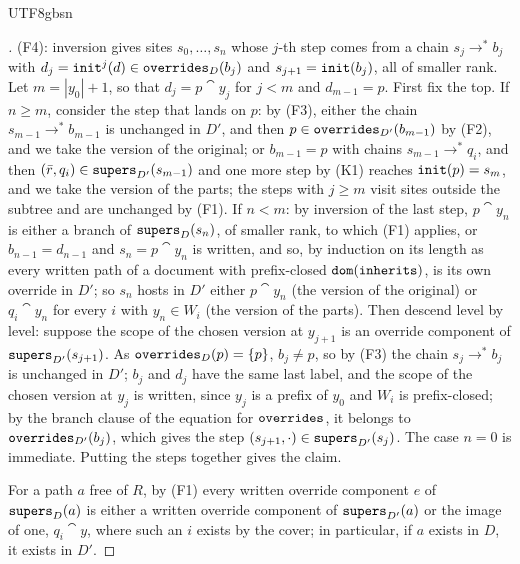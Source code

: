 \begin{CJK*}{UTF8}{gbsn}
\begin{proof}[]
\begin{sloppypar}
(F4): inversion gives sites $s_0, \ldots, s_n$ whose $j$-th step comes from a chain $s_j \to^* b_j$ with
$d_j = \mathtt{init}^j(d) \in \mathtt{overrides}_D(b_j)$ and $s_{j+1} = \mathtt{init}(b_j)$, all of smaller rank. Let
$m = |y_0| + 1$, so that $d_j = p \cat y_j$ for $j < m$ and $d_{m-1} = p$. First fix the top. If
$n \ge m$, consider the step that lands on $p$: by (F3), either the chain $s_{m-1} \to^* b_{m-1}$ is
unchanged in $D'$, and then $p \in \mathtt{overrides}_{D'}(b_{m-1})$ by (F2), and we take the version of the
original; or $b_{m-1} = p$ with chains $s_{m-1} \to^* q_i$, and then $(\bar r, q_i) \in \mathtt{supers}_{D'}(s_{m-1})$
and one more step by (K1) reaches $\mathtt{init}(p) = s_m$, and we take the version of the parts; the steps with
$j \ge m$ visit sites outside the subtree and are unchanged by (F1). If $n < m$: by inversion of the last
step, $p \cat y_n$ is either a branch of $\mathtt{supers}_D(s_n)$, of smaller rank, to which (F1) applies, or
$b_{n-1} = d_{n-1}$ and $s_n = p \cat y_n$ is written, and so, by induction on its length as every written path of a document with
prefix-closed $\mathtt{dom}(\mathtt{inherits})$, is its own override in $D'$; so $s_n$ hosts in $D'$ either $p \cat y_n$ (the version of the original) or $q_i \cat y_n$ for every
$i$ with $y_n \in W_i$ (the version of the parts). Then descend level by level: suppose the scope of the
chosen version at $y_{j+1}$ is an override component of $\mathtt{supers}_{D'}(s_{j+1})$. As
$\mathtt{overrides}_D(p) = \{p\}$, $b_j \ne p$, so by (F3) the chain $s_j \to^* b_j$ is unchanged in $D'$; $b_j$
and $d_j$ have the same last label, and the scope of the chosen version at $y_j$ is written, since $y_j$
is a prefix of $y_0$ and $W_i$ is prefix-closed; by the branch clause of the equation for $\mathtt{overrides}$,
it belongs to $\mathtt{overrides}_{D'}(b_j)$, which gives the step $(s_{j+1}, \cdot) \in \mathtt{supers}_{D'}(s_j)$.
The case $n = 0$ is immediate. Putting the steps together gives the claim.

For a path $a$ free of $R$, by (F1) every written override component $e$ of $\mathtt{supers}_D(a)$ is either a
written override component of $\mathtt{supers}_{D'}(a)$ or the image of one, $q_i \cat y$, where such an $i$ exists by the cover; in particular, if $a$
exists in $D$, it exists in $D'$.
\end{sloppypar}
\fi
\end{proof}


\end{CJK*}
